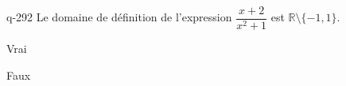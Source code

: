 \begin{truefalse}{q-292}
Le domaine de définition de l'expression $\dfrac{x+2}{x^2+1}$ est $\mathbb R \setminus \{-1,1\}$.
\item Vrai
\item* Faux
\end{truefalse}

